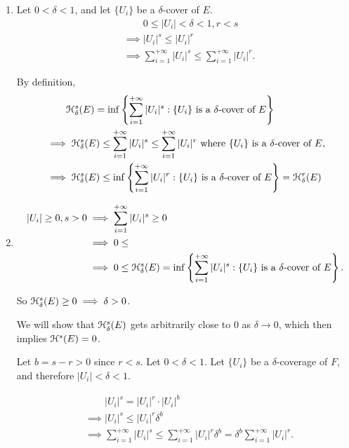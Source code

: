 \begin{enumerate}
    \item Let \(0 < \delta < 1\), and let \(\{U_i\}\) be a \(\delta\)-cover of \(E\).
    \begin{align*}
        &\phantom{\implies} 0 \leq |U_i| < \delta < 1, r < s\\
        &\implies |U_i|^s \leq |U_i|^r\\
        &\implies \sum_{i = 1}^{+\infty} |U_i|^s \leq \sum_{i = 1}^{+\infty} |U_i|^r.
    \end{align*}

    By definition,
    \begin{align*}
        &\phantom{\implies} \mathcal{H}_\delta^s(E) = \inf \left\{\sum_{i = 1}^{+\infty} |U_i|^s : \{U_i\} \text{ is a } \delta\text{-cover of } E\right\}\\
        &\implies \mathcal{H}_{\delta}^s(E) \leq \sum_{i = 1}^{+\infty} |U_i|^s \leq \sum_{i = 1}^{+\infty} |U_i|^r\text{ where } \{U_i\} \text{ is a } \delta\text{-cover of } E, \\
        &\implies \mathcal{H}_\delta^s(E) \leq \inf\left\{\sum_{i = 1}^{+\infty} |U_i|^r : \{U_i\} \text{ is a } \delta\text{-cover of } E\right\} = \mathcal{H}_\delta^r(E)
    \end{align*}

    \item
    \begin{align*}
        |U_i| \geq 0, s > 0 &\implies \sum_{i = 1}^{+\infty} |U_i|^s \geq 0\\
        &\implies 0 \leq \\
        &\implies 0 \leq \mathcal{H}_{\delta}^s(E) =  \inf \left\{\sum_{i = 1}^{+\infty} |U_i|^s : \{U_i\} \text{ is a } \delta\text{-cover of } E\right\}.
    \end{align*}

    So \(\mathcal{H}_{\delta}^s (E) \geq 0 \implies \delta > 0\).

    We will show that \(\mathcal{H}_{\delta}^s(E)\) gets arbitrarily close to \(0\) as \(\delta \to 0\), which then implies \(\mathcal{H}^s(E) = 0\).

    Let \(b = s - r > 0\) since \(r < s\). Let \(0 < \delta < 1\). Let \(\{U_i\}\) be a \(\delta\)-coverage of \(F\), and therefore \(|U_i| < \delta < 1\).

    \begin{align*}
        &\phantom{\implies} |U_i|^s = |U_i|^r \cdot |U_i|^b\\
        &\implies |U_i|^s \leq |U_i|^r \delta^b\\
        &\implies \sum_{i = 1}^{+\infty} |U_i|^s \leq \sum_{i = 1}^{+\infty} |U_i|^r \delta^b = \delta^b \sum_{i = 1}^{+\infty} |U_i|^r.
    \end{align*}


\end{enumerate}
